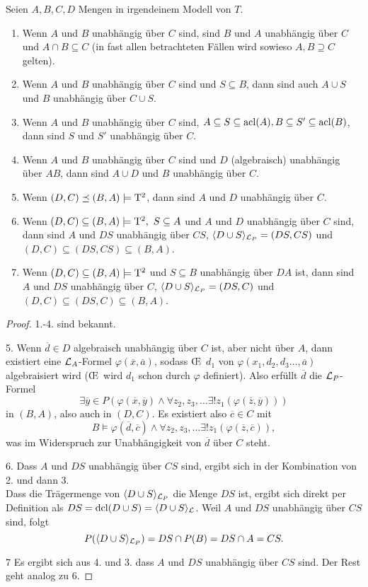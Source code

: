 \begin{lemma}\label{Unabhängigkeitsregeln}
	Seien $A,B,C,D$ Mengen in irgendeinem Modell von $T$.
	\begin{enumerate}
		\item Wenn $A$ und $B$ unabhängig über $C$ sind, sind $B$ und $A$ unabhängig über $C$ und $A\cap B\subseteq C$ (in fast allen betrachteten Fällen wird sowieso $A,B\supseteq C$ gelten).
		\item Wenn $A$ und $B$ unabhängig über $C$ sind und $S\subseteq B$, dann sind auch $A\cup S$ und $B$ unabhängig über $C\cup S$.
		\item Wenn $A$ und $B$ unabhängig über $C$ sind, $A\subseteq S\subseteq\operatorname{acl}(A),B\subseteq S'\subseteq\operatorname{acl}(B)$, dann sind $S$ und $S'$ unabhängig über $C$.
		\item Wenn $A$ und $B$ unabhängig über $C$ sind und $D$ (algebraisch) unabhängig über $AB$, dann sind $A\cup D$ und $B$ unabhängig über $C$.
		\item Wenn $(D,C)\preceq(B,A)\models\operatorname{T^2}$, dann sind $A$ und $D$ unabhängig über $C$.
		\item Wenn $(D,C)\subseteq(B,A)\models\tq,\ S\subseteq A$ und $A$ und $D$ unabhängig über $C$ sind, dann sind $A$ und $DS$ unabhängig über $CS$, $\langle D\cup S\rangle_{\mathcal{L}_P}=(DS,CS)$ und $(D,C)\subseteq(DS,CS)\subseteq(B,A)$.
		\item Wenn $(D,C)\subseteq(B,A)\models\operatorname{T^2}$ und $S\subseteq B$ unabhängig über $DA$ ist, dann sind $A$ und $DS$ unabhängig über $C$, $\langle D\cup S\rangle_{\mathcal{L}_P}=(DS,C)$ und $(D,C)\subseteq(DS,C)\subseteq(B,A)$.
	\end{enumerate}
\end{lemma}
\begin{proof}
	1.-4. sind bekannt.
	\item[5.] Wenn $\overline{d}\in D$ algebraisch unabhängig über $C$ ist, aber nicht über $A$, dann existiert eine $\mathcal{L}_A$-Formel $\varphi(\overline{x},\overline{a})$, sodass \OE\ $d_1$ von $\varphi(x_1,d_2,d_3\dots,\overline{a})$ algebraisiert wird (\OE\ wird $d_1$ schon durch $\varphi$ definiert). Also erfüllt $\overline{d}$ die $\mathcal{L}_P$-Formel $$\exists \overline{y}\in P(\varphi(\overline{x},\overline{y})\land\forall z_2,z_3,\dots\exists! z_1(\varphi(\overline{z},\overline{y})))$$ in $(B,A)$, also auch in $(D,C)$. Es existiert also $\overline{c}\in C$ mit $$B\models\varphi(\overline{d},\overline{c})\land\forall z_2,z_3,\dots\exists! z_1(\varphi(\overline{z},\overline{c})),$$ was im Widerspruch zur Unabhängigkeit von $\overline{d}$ über $C$ steht.
	\item[6.] Dass $A$ und $DS$ unabhängig über $CS$ sind, ergibt sich in der Kombination von 2. und dann 3.\\
	Dass die Trägermenge von $\langle D\cup S\rangle_{\mathcal{L}_P}$ die Menge $DS$ ist, ergibt sich direkt per Definition als $DS=\operatorname{dcl}(D\cup S)=\langle D\cup S\rangle_{\mathcal{L}}$. Weil $A$ und $DS$ unabhängig über $CS$ sind, folgt $$P(\langle D\cup S\rangle_{\mathcal{L}_P})=DS\cap P(B)=DS\cap A=CS.$$
	\item[7] Es ergibt sich aus 4. und 3. dass $A$ und $DS$ unabhängig über $CS$ sind. Der Rest geht analog zu 6.
\end{proof}

